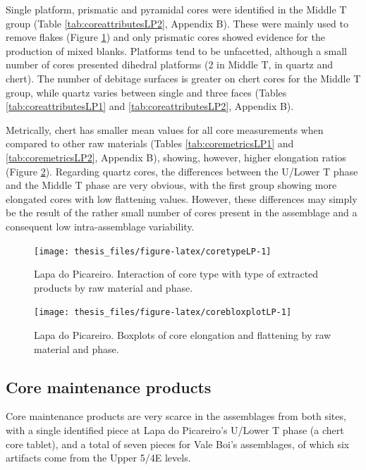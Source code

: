\documentclass[12pt,twoside]{reedthesis}
\begin{document}
Single platform, prismatic and pyramidal cores were identified in the Middle T group (Table \ref{tab:coreattributesLP2}, Appendix B). These were mainly used to remove flakes (Figure \ref{fig:coretypeLP}) and only prismatic cores showed evidence for the production of mixed blanks. Platforms tend to be unfacetted, although a small number of cores presented dihedral platforms (2 in Middle T, in quartz and chert). The number of debitage surfaces is greater on chert cores for the Middle T group, while quartz varies between single and three faces (Tables \ref{tab:coreattributesLP1} and \ref{tab:coreattributesLP2}, Appendix B).

Metrically, chert has smaller mean values for all core measurements when compared to other raw materials (Tables \ref{tab:coremetricsLP1} and \ref{tab:coremetricsLP2}, Appendix B), showing, however, higher elongation ratios (Figure \ref{fig:corebloxplotLP}). Regarding quartz cores, the differences between the U/Lower T phase and the Middle T phase are very obvious, with the first group showing more elongated cores with low flattening values. However, these differences may simply be the result of the rather small number of cores present in the assemblage and a consequent low intra-assemblage variability.
\begin{figure}[H]

{\centering \texttt{[image: thesis\_files/figure-latex/coretypeLP-1]} 

}

\caption{Lapa do Picareiro. Interaction of core type with type of extracted products by raw material and phase.}\label{fig:coretypeLP}
\end{figure}
\begin{figure}[H]

{\centering \texttt{[image: thesis\_files/figure-latex/corebloxplotLP-1]} 

}

\caption{Lapa do Picareiro. Boxplots of core elongation and flattening by raw material and phase.}\label{fig:corebloxplotLP}
\end{figure}
\newpage

\hypertarget{core-maintenance-products}{%
\subsection{Core maintenance products}\label{core-maintenance-products}}

Core maintenance products are very scarce in the assemblages from both sites, with a single identified piece at Lapa do Picareiro's U/Lower T phase (a chert core tablet), and a total of seven pieces for Vale Boi's assemblages, of which six artifacts come from the Upper 5/4E levels.
\end{document}

